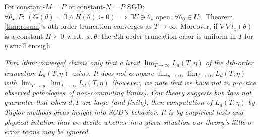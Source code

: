             \begin{thm} \label{thm:converge}
                For constant-$M=P$ or constant-$N=P$ SGD:
                $\forall \theta_\star,P:\, (G(\theta)=0 \wedge H(\theta)\succ
                0) \implies \exists U\ni \theta_\star\,\,\text{open}:\, \forall
                \theta_0\in U:\,$
                Theorem \ref{thm:resum}'s $d$th-order truncation converges
                as $T\to \infty$.
                Moreover, if $\nabla\nabla l_x(\theta)$ is a constant $H\succ 0$
                w.r.t.\ $x, \theta$: the $d$th order truncation error is uniform
                in $T$ for $\eta$ small enough.
            \end{thm}
            \begin{rmk}
                \emph{
                Thm \ref{thm:converge} claims only that a limit
                $\lim_{T\to\infty} L_d(T,\eta)$ of the
                $d$th-order truncation $L_d(T,\eta)$ exists.
                It does not compare $\lim_{d\to\infty}
                \lim_{T\to\infty} L_d(T,\eta)$ with $\lim_{T\to\infty}
                \lim_{d\to\infty} L_d(T,\eta)$ (however, we note that we have not in practice
                observed pathologies of non-commuting limits).
                Our theory suggests but does not guarantee that when $d, T$ are
                large (and finite), then computation of $L_d(T,\eta)$ by Taylor
                methods gives insight into SGD's behavior.  It is by empirical
                tests and physical intution that we decide whether in a given
                situation our theory's little-$o$ error terms may be ignored. 
                \hfill\mend
                }
            \end{rmk}

